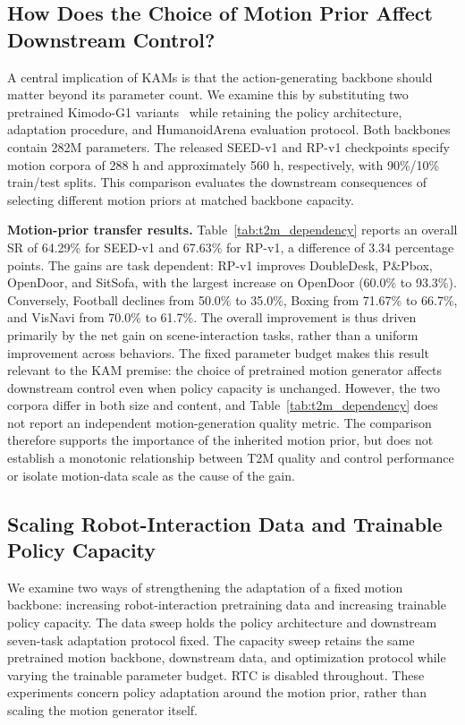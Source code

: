 \subsection{How Does the Choice of Motion Prior Affect Downstream Control?}
\label{sec:exp_t2m}

A central implication of KAMs is that the action-generating backbone should matter beyond its parameter count. We examine this by substituting two pretrained Kimodo-G1 variants~\citep{kimodo} while retaining the policy architecture, adaptation procedure, and HumanoidArena evaluation protocol. Both backbones contain 282M parameters. The released SEED-v1 and RP-v1 checkpoints specify motion corpora of 288 h and approximately 560 h, respectively, with 90\%/10\% train/test splits. This comparison evaluates the downstream consequences of selecting different motion priors at matched backbone capacity.



\textbf{Motion-prior transfer results.} Table~\ref{tab:t2m_dependency} reports an overall SR of 64.29\% for SEED-v1 and 67.63\% for RP-v1, a difference of 3.34 percentage points. The gains are task dependent: RP-v1 improves DoubleDesk, P\&Pbox, OpenDoor, and SitSofa, with the largest increase on OpenDoor (60.0\% to 93.3\%). Conversely, Football declines from 50.0\% to 35.0\%, Boxing from 71.67\% to 66.7\%, and VisNavi from 70.0\% to 61.7\%. The overall improvement is thus driven primarily by the net gain on scene-interaction tasks, rather than a uniform improvement across behaviors. The fixed parameter budget makes this result relevant to the KAM premise: the choice of pretrained motion generator affects downstream control even when policy capacity is unchanged. However, the two corpora differ in both size and content, and Table~\ref{tab:t2m_dependency} does not report an independent motion-generation quality metric. The comparison therefore supports the importance of the inherited motion prior, but does not establish a monotonic relationship between T2M quality and control performance or isolate motion-data scale as the cause of the gain.

\subsection{Scaling Robot-Interaction Data and Trainable Policy Capacity}
\label{sec:exp_scaling}

We examine two ways of strengthening the adaptation of a fixed motion backbone: increasing robot-interaction pretraining data and increasing trainable policy capacity. The data sweep holds the policy architecture and downstream seven-task adaptation protocol fixed. The capacity sweep retains the same pretrained motion backbone, downstream data, and optimization protocol while varying the trainable parameter budget. RTC is disabled throughout. These experiments concern policy adaptation around the motion prior, rather than scaling the motion generator itself.

